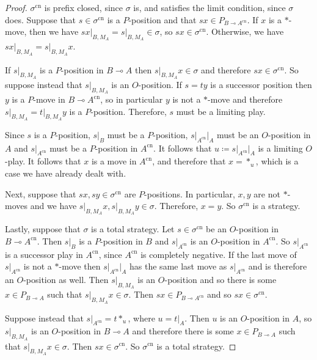 \documentclass[11pt]{article} %
\theoremstyle{plain} %
\theoremstyle{definition} %
\theoremstyle{note}
\theoremstyle{exercisestyle}
\renewcommand{\implies}{\multimap}
\DeclareMathOperator{\cn}{cn}
\begin{document}
\begin{proof}
  $\sigma^{\cn}$ is prefix closed, since $\sigma$ is, and satisfies the limit condition, since $\sigma$ does.  Suppose that $s\in\sigma^{\cn}$ is a $P$-position and that $sx\in P_{B\implies A^{\cn}}$.  If $x$ is a $*$-move, then we have $sx\vert_{B,M_A}=s\vert_{B,M_A}\in\sigma$, so $sx\in\sigma^{\cn}$.  Otherwise, we have $sx\vert_{B,M_A}=s\vert_{B,M_A}x$.  

  If $s\vert_{B,M_A}$ is a $P$-position in $B\implies A$ then $s\vert_{B,M_A}x\in\sigma$ and therefore $sx\in\sigma^{\cn}$.  So suppose instead that $s\vert_{B,M_A}$ is an $O$-position.  If $s=ty$ is a successor position then $y$ is a $P$-move in $B\implies A^{\cn}$, so in particular $y$ is not a $*$-move and therefore $s\vert_{B,M_A}=t\vert_{B,M_A}y$ is a $P$-position.  Therefore, $s$ must be a limiting play.  

  Since $s$ is a $P$-position, $s\vert_B$ must be a $P$-position, $s\vert_{A^{\cn}}\vert_A$ must be an $O$-position in $A$ and $s\vert_{A^{\cn}}$ must be a $P$-position in $A^{\cn}$.  It follows that $u\coloneqq s\vert_{A^{\cn}}\vert_A$ is a limiting $O$-play.  It follows that $x$ is a move in $A^{\cn}$, and therefore that $x=*_u$, which is a case we have already dealt with.

  Next, suppose that $sx, sy\in\sigma^{\cn}$ are $P$-positions.  In particular, $x,y$ are not $*$-moves and we have $s\vert_{B,M_A}x,s\vert_{B,M_A}y\in\sigma$.  Therefore, $x=y$.  So $\sigma^{\cn}$ is a strategy.

  Lastly, suppose that $\sigma$ is a total strategy.  Let $s\in\sigma^{\cn}$ be an $O$-position in $B\implies A^{\cn}$.  Then $s\vert_B$ is a $P$-position in $B$ and $s\vert_{A^{\cn}}$ is an $O$-position in $A^{\cn}$.  So $s\vert_{A^{\cn}}$ is a successor play in $A^{\cn}$, since $A^{\cn}$ is completely negative.  If the last move of $s\vert_{A^{\cn}}$ is not a $*$-move then $s\vert_{A^{\cn}}\vert_A$ has the same last move as $s\vert_{A^{\cn}}$ and is therefore an $O$-position as well.  Then $s\vert_{B,M_A}$ is an $O$-position and so there is some $x\in P_{B\implies A}$ such that $s\vert_{B,M_A}x\in\sigma$. Then $sx\in P_{B\implies A^{\cn}}$ and so $sx\in\sigma^{\cn}$.  

  Suppose instead that $s\vert_{A^{\cn}}=t*_u$, where $u=t\vert_A$.  Then $u$ is an $O$-position in $A$, so $s\vert_{B,M_A}$ is an $O$-position in $B\implies A$ and therefore there is some $x\in P_{B\implies A}$ such that $s\vert_{B,M_A}x\in\sigma$.  Then $sx\in\sigma^{\cn}$.  So $\sigma^{\cn}$ is a total strategy.


\end{proof}
\end{document}
